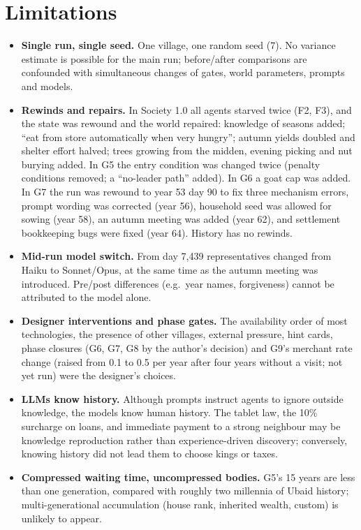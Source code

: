 \documentclass[11pt]{article}
\begin{document}
\section{Limitations}
\label{sec:interventions}

\begin{itemize}
  \item \textbf{Single run, single seed.} One village, one random seed (7). No variance estimate is possible for the main run; before/after comparisons are confounded with simultaneous changes of gates, world parameters, prompts and models.
  \item \textbf{Rewinds and repairs.} In Society 1.0 all agents starved twice (F2, F3), and the state was rewound and the world repaired: knowledge of seasons added; ``eat from store automatically when very hungry''; autumn yields doubled and shelter effort halved; trees growing from the midden, evening picking and nut burying added. In G5 the entry condition was changed twice (penalty conditions removed; a ``no-leader path'' added). In G6 a goat cap was added. In G7 the run was rewound to year 53 day 90 to fix three mechanism errors, prompt wording was corrected (year 56), household seed was allowed for sowing (year 58), an autumn meeting was added (year 62), and settlement bookkeeping bugs were fixed (year 64). History has no rewinds.
  \item \textbf{Mid-run model switch.} From day 7{,}439 representatives changed from Haiku to Sonnet/Opus, at the same time as the autumn meeting was introduced. Pre/post differences (e.g.\ year names, forgiveness) cannot be attributed to the model alone.
  \item \textbf{Designer interventions and phase gates.} The availability order of most technologies, the presence of other villages, external pressure, hint cards, phase closures (G6, G7, G8 by the author's decision) and G9's merchant rate change (raised from 0.1 to 0.5 per year after four years without a visit; not yet run) were the designer's choices.
  \item \textbf{LLMs know history.} Although prompts instruct agents to ignore outside knowledge, the models know human history. The tablet law, the 10\% surcharge on loans, and immediate payment to a strong neighbour may be knowledge reproduction rather than experience-driven discovery; conversely, knowing history did not lead them to choose kings or taxes.
  \item \textbf{Compressed waiting time, uncompressed bodies.} G5's 15 years are less than one generation, compared with roughly two millennia of Ubaid history; multi-generational accumulation (house rank, inherited wealth, custom) is unlikely to appear.

\end{itemize}
\end{document}
